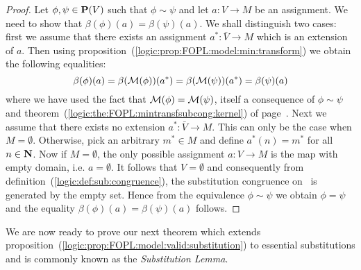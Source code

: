 \begin{proof}
Let $\phi,\psi\in\mbox{${\bf P}(V)$}$ such that $\phi\sim\psi$ and let $a:V\to M$ be
an assignment. We need to show that $\beta(\phi)(a)=\beta(\psi)(a)$.
We shall distinguish two cases: first we assume that there exists an
assignment $a^{*}:\bar{V}\to M$ which is an extension of $a$. Then
using proposition~(\ref{logic:prop:FOPL:model:min:transform}) we
obtain the following equalities:
    \[
    \beta(\phi)(a)=\beta({\cal M}(\phi))(a^{*})=\beta({\cal
    M}(\psi))(a^{*})=\beta(\psi)(a)
    \]
where we have used the fact that ${\cal M}(\phi)={\cal M}(\psi)$,
itself a consequence of $\phi\sim\psi$ and
theorem~(\ref{logic:the:FOPL:mintransfsubcong:kernel}) of
page~\pageref{logic:the:FOPL:mintransfsubcong:kernel}. Next we
assume that there exists no extension $a^{*}:\bar{V}\to M$. This can
only be the case when $M=\emptyset$. Otherwise, pick an arbitrary
$m^{*}\in M$ and define $a^{*}(n)=m^{*}$ for all $n\in\mbox{$\bf N$}$. Now if
$M=\emptyset$, the only possible assignment $a:V\to M$ is the map
with empty domain, i.e. $a=\emptyset$. It follows that $V=\emptyset$
and consequently from definition~(\ref{logic:def:sub:congruence}),
the substitution congruence on \pv\ is generated by the empty set.
Hence from the equivalence $\phi\sim\psi$ we obtain $\phi=\psi$ and
the equality $\beta(\phi)(a)=\beta(\psi)(a)$ follows.
\end{proof}

We are now ready to prove our next theorem which extends
proposition~(\ref{logic:prop:FOPL:model:valid:substitution}) to
essential substitutions and is commonly known as the {\em
Substitution Lemma}.

